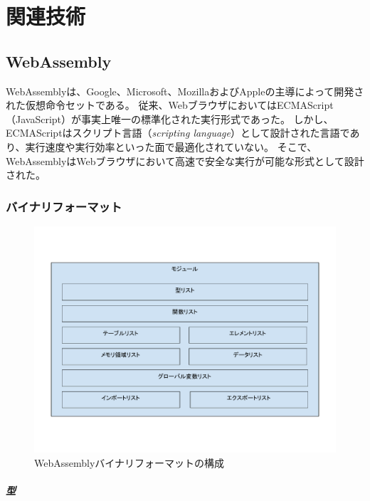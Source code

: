 \chapter{関連技術}
\label{chap:related_works}

\section{WebAssembly}

WebAssemblyは、Google、Microsoft、MozillaおよびAppleの主導によって開発された仮想命令セットである\cite{webassembly}。
従来、WebブラウザにおいてはECMAScript（JavaScript）が事実上唯一の標準化された実行形式であった。
しかし、ECMAScriptはスクリプト言語（{\it scripting language}）として設計された言語であり\cite{ecma2018}、実行速度や実行効率といった面で最適化されていない。
そこで、WebAssemblyはWebブラウザにおいて高速で安全な実行が可能な形式として設計された。

\subsection{バイナリフォーマット}

\begin{figure}[htbp]
  \caption{WebAssemblyバイナリフォーマットの構成}
  \label{fig:wasm_module}
  \begin{center}
    \includegraphics[bb=0 0 800 600,width=12cm]{img/wasm_module.pdf}
  \end{center}
\end{figure}

\paragraph{型}

